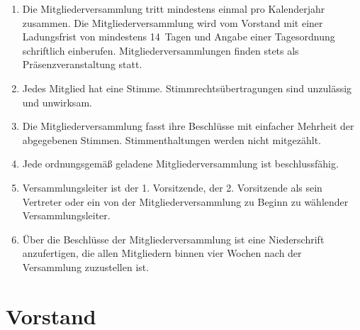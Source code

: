 \documentclass[a4paper, 10pt, headings=normal]{scrartcl}
\begin{document}
\begin{multicols}{2}
\begin{enumerate}[label={(\arabic*)}]
	\item
		Die Mitgliederversammlung tritt mindestens einmal pro Kalenderjahr zusammen.
		Die Mitgliederversammlung wird vom Vorstand mit einer Ladungsfrist von mindestens 14~Tagen und Angabe einer Tagesordnung schriftlich einberufen.
		Mitgliederversammlungen finden stets als Präsenzveranstaltung statt.
	\item
		Jedes Mitglied hat eine Stimme.
		Stimmrechtsübertragungen sind unzulässig und unwirksam.
	\item
		Die Mitgliederversammlung fasst ihre Beschlüsse mit einfacher Mehrheit der abgegebenen Stimmen.
		Stimmenthaltungen werden nicht mitgezählt.
	\item
		Jede ordnungsgemäß geladene Mitgliederversammlung ist beschlussfähig.
	\item
		Versammlungsleiter ist der 1. Vorsitzende, der 2. Vorsitzende als sein Vertreter oder ein von der Mitgliederversammlung zu Beginn zu wählender Versammlungsleiter.
	\item
		Über die Beschlüsse der Mitgliederversammlung ist eine Niederschrift anzufertigen, die allen Mitgliedern binnen vier Wochen nach der Versammlung zuzustellen ist.
\end{enumerate}

\section{Vorstand}
\label{par:vorstand}


\end{multicols}
\end{document}
